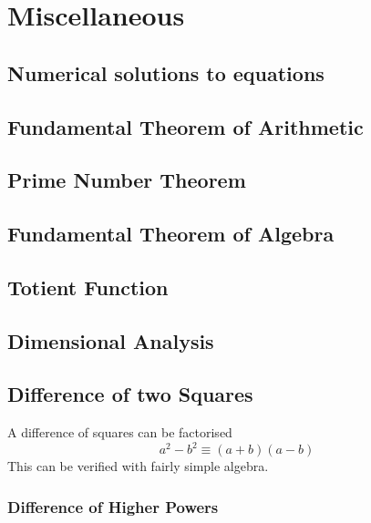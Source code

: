 \documentclass[fleqn,a4paper,11pt]{article}
\begin{document}
    \section{Miscellaneous}

%

    \subsection{Numerical solutions to equations}

    \subsection{Fundamental Theorem of Arithmetic}

    \subsection{Prime Number Theorem}

    \subsection{Fundamental Theorem of Algebra}

    \subsection{Totient Function} \label{sec_totient}

    \subsection{Dimensional Analysis}

    \subsection{Difference of two Squares}

    A difference of squares can be factorised
    \begin{equation}
    a^2 - b^2 \equiv (a + b)(a - b)
    \end{equation}
    This can be verified with fairly simple
    algebra.

    \subsubsection{Difference of Higher Powers}
\end{document}
